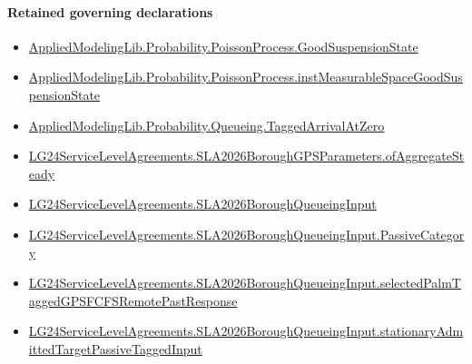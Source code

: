 \documentclass[10pt]{article}
\begin{document}
\paragraph{Retained governing declarations}
\begin{itemize}\raggedright
\item \hyperlink{governing-declaration-ab1cfe37ad8c32b0}{Applied\allowbreak{}Modeling\allowbreak{}Lib.\allowbreak{}Probability.\allowbreak{}Poisson\allowbreak{}Process.\allowbreak{}Good\allowbreak{}Suspension\allowbreak{}State}
\item \hyperlink{governing-declaration-a8385d799d0a4d16}{Applied\allowbreak{}Modeling\allowbreak{}Lib.\allowbreak{}Probability.\allowbreak{}Poisson\allowbreak{}Process.\allowbreak{}inst\allowbreak{}Measurable\allowbreak{}Space\allowbreak{}Good\allowbreak{}Suspension\allowbreak{}State}
\item \hyperlink{governing-declaration-a69bedb5b0d420c6}{Applied\allowbreak{}Modeling\allowbreak{}Lib.\allowbreak{}Probability.\allowbreak{}Queueing.\allowbreak{}Tagged\allowbreak{}Arrival\allowbreak{}At\allowbreak{}Zero}
\item \hyperlink{governing-declaration-d97c39780baffce1}{LG24\allowbreak{}Service\allowbreak{}Level\allowbreak{}Agreements.\allowbreak{}SLA2026\allowbreak{}Borough\allowbreak{}GPS\allowbreak{}Parameters.\allowbreak{}of\allowbreak{}Aggregate\allowbreak{}Steady}
\item \hyperlink{governing-declaration-3e29dad51cd2861a}{LG24\allowbreak{}Service\allowbreak{}Level\allowbreak{}Agreements.\allowbreak{}SLA2026\allowbreak{}Borough\allowbreak{}Queueing\allowbreak{}Input}
\item \hyperlink{governing-declaration-abc91e26948cf0a3}{LG24\allowbreak{}Service\allowbreak{}Level\allowbreak{}Agreements.\allowbreak{}SLA2026\allowbreak{}Borough\allowbreak{}Queueing\allowbreak{}Input.\allowbreak{}Passive\allowbreak{}Category}
\item \hyperlink{governing-declaration-25e29e7d4e12d48f}{LG24\allowbreak{}Service\allowbreak{}Level\allowbreak{}Agreements.\allowbreak{}SLA2026\allowbreak{}Borough\allowbreak{}Queueing\allowbreak{}Input.\allowbreak{}selected\allowbreak{}Palm\allowbreak{}Tagged\allowbreak{}GPSFCFS\allowbreak{}Remote\allowbreak{}Past\allowbreak{}Response}
\item \hyperlink{governing-declaration-959c2ba9ad86ea2b}{LG24\allowbreak{}Service\allowbreak{}Level\allowbreak{}Agreements.\allowbreak{}SLA2026\allowbreak{}Borough\allowbreak{}Queueing\allowbreak{}Input.\allowbreak{}stationary\allowbreak{}Admitted\allowbreak{}Target\allowbreak{}Passive\allowbreak{}Tagged\allowbreak{}Input}

\end{itemize}
\end{document}
